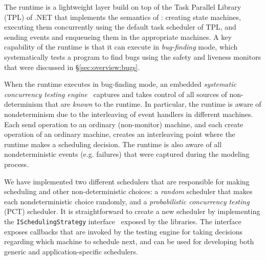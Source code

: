 The \psharp runtime is a lightweight layer build on top of the Task Parallel Library (TPL) of .NET that implements the semantics of \psharp: creating state machines, executing them concurrently using the default task scheduler of TPL, and sending events and enqueueing them in the appropriate machines. A key capability of the \psharp runtime is that it can execute in \emph{bug-finding} mode, which systematically tests a \psharp program to find bugs using the safety and liveness monitors that were discussed in \S\ref{sec:overview:bugs}.

When the \psharp runtime executes in bug-finding mode, an embedded \emph{systematic concurrency testing engine}~\cite{godefroid1997verisoft, musuvathi2008finding, emmi2011delay} captures and takes control of all sources of non-determinism that are \emph{known} to the \psharp runtime. In particular, the runtime is aware of nondeterminism due to the interleaving of event handlers in different machines. Each send operation to an ordinary (non-monitor) machine, and each create operation of an ordinary machine, creates an interleaving point where the runtime makes a scheduling decision. The runtime is also aware of all nondeterministic events (e.g. failures) that were captured during the modeling process.

We have implemented two different schedulers that are responsible for making scheduling and other non-deterministic choices: a \emph{random} scheduler that makes each nondeterministic choice randomly, and a \emph{probabilistic concurrency testing}~\cite{burckhardt2010pct} (PCT) scheduler. It is straightforward to create a new scheduler by implementing the \texttt{ISchedulingStrategy} interface~\cite{desai2015systematic} exposed by the \psharp libraries. The interface exposes callbacks that are invoked by the \psharp testing engine for taking decisions regarding which machine to schedule next, and can be used for developing both generic and application-specific schedulers.

